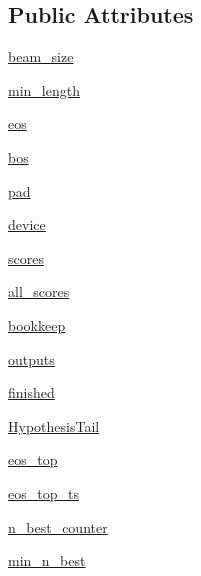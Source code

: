 \subsection*{Public Attributes}
\begin{DoxyCompactItemize}
\item 
\hyperlink{classparlai_1_1agents_1_1legacy__agents_1_1seq2seq_1_1utils__v0_1_1Beam_aa23d688e6e9c2d6ced98d57ac1a7059c}{beam\+\_\+size}
\item 
\hyperlink{classparlai_1_1agents_1_1legacy__agents_1_1seq2seq_1_1utils__v0_1_1Beam_a7d6ef73f817ea0cddaaa2857f5fab206}{min\+\_\+length}
\item 
\hyperlink{classparlai_1_1agents_1_1legacy__agents_1_1seq2seq_1_1utils__v0_1_1Beam_a821bdac1bbdef3faa186729b7b361da8}{eos}
\item 
\hyperlink{classparlai_1_1agents_1_1legacy__agents_1_1seq2seq_1_1utils__v0_1_1Beam_abae3db8ae23e5e334edceeeaf6bd4517}{bos}
\item 
\hyperlink{classparlai_1_1agents_1_1legacy__agents_1_1seq2seq_1_1utils__v0_1_1Beam_a2b566884e7d177fcbcdcad1547dcf070}{pad}
\item 
\hyperlink{classparlai_1_1agents_1_1legacy__agents_1_1seq2seq_1_1utils__v0_1_1Beam_a5bc1b513284975d51d9ec9554fa29f94}{device}
\item 
\hyperlink{classparlai_1_1agents_1_1legacy__agents_1_1seq2seq_1_1utils__v0_1_1Beam_a6f0cb3d9a944a1c1bab850834d81b798}{scores}
\item 
\hyperlink{classparlai_1_1agents_1_1legacy__agents_1_1seq2seq_1_1utils__v0_1_1Beam_ae8e9fc9a712aef34dc78d40faf089d79}{all\+\_\+scores}
\item 
\hyperlink{classparlai_1_1agents_1_1legacy__agents_1_1seq2seq_1_1utils__v0_1_1Beam_a660602181552d0ef501cb99b68d790f3}{bookkeep}
\item 
\hyperlink{classparlai_1_1agents_1_1legacy__agents_1_1seq2seq_1_1utils__v0_1_1Beam_a6383bb09ede1b1c681c0eb1ac0bd15f8}{outputs}
\item 
\hyperlink{classparlai_1_1agents_1_1legacy__agents_1_1seq2seq_1_1utils__v0_1_1Beam_a3761685a56c34b82ab6533814b869851}{finished}
\item 
\hyperlink{classparlai_1_1agents_1_1legacy__agents_1_1seq2seq_1_1utils__v0_1_1Beam_aa6b1326a200ef63b4b19fbbffc82a14c}{Hypothesis\+Tail}
\item 
\hyperlink{classparlai_1_1agents_1_1legacy__agents_1_1seq2seq_1_1utils__v0_1_1Beam_a707079827f1a9da806ebe4f9c8c1a6bb}{eos\+\_\+top}
\item 
\hyperlink{classparlai_1_1agents_1_1legacy__agents_1_1seq2seq_1_1utils__v0_1_1Beam_a2394cda184a58df72b20806215927edf}{eos\+\_\+top\+\_\+ts}
\item 
\hyperlink{classparlai_1_1agents_1_1legacy__agents_1_1seq2seq_1_1utils__v0_1_1Beam_ae8326e055b483e54536dea4210ea5346}{n\+\_\+best\+\_\+counter}
\item 
\hyperlink{classparlai_1_1agents_1_1legacy__agents_1_1seq2seq_1_1utils__v0_1_1Beam_a7709dc9d035f249283776d08ca4d93c8}{min\+\_\+n\+\_\+best}
\end{DoxyCompactItemize}


